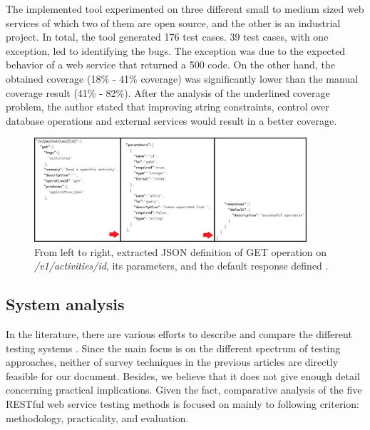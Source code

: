 \documentclass[english]{tktltiki}
\begin{document}
The implemented tool experimented on three different small to medium sized web services of which two of them are open source, and the other is an industrial project. In total, the tool generated 176 test cases. 39 test cases, with one exception, led to identifying the bugs. The exception was due to the expected behavior of a web service that returned a 500 code. On the other hand, the obtained coverage (18\% - 41\% coverage) was significantly lower than the manual coverage result (41\% - 82\%). After the analysis of the underlined coverage problem, the author stated that improving string constraints, control over database operations and external services would result in a better coverage.
\begin{figure}[h]
	\begin{center}
		\includegraphics[width=0.9\textwidth]{images/swagger_c.png}
		\caption{From left to right, extracted JSON definition of GET operation on \textit{/v1/activities/{id}}, its parameters, and the default response defined \cite{arcuri2017restful}. }
		\label{fig:swagger}
	\end{center}
\end{figure}

\subsection{System analysis}
In the literature, there are various efforts to describe and compare the different testing systems \cite{canfora2006testing, canfora2009service, bozkurt2013testing}. Since the main focus is on the different spectrum of testing approaches, neither of survey techniques in the previous articles are directly feasible for our document. Besides, we believe that it does not give enough detail concerning practical implications. Given the fact, comparative analysis of the five RESTful web service testing methods is focused on mainly to following criterion: methodology, practicality, and evaluation.
\end{document}
